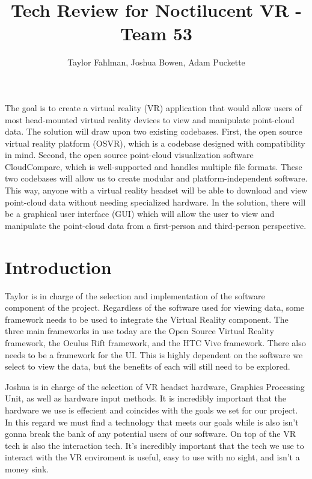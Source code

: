\documentclass{article}
\begin{document}
\title {Tech Review for Noctilucent VR - Team 53}
\author {Taylor Fahlman, Joshua Bowen, Adam Puckette}

\maketitle

\abstract

The goal is to create a virtual reality (VR) application that would allow users of most head-mounted virtual reality devices to view and manipulate point-cloud data. 
The solution will draw upon two existing codebases. 
First, the open source virtual reality platform (OSVR), which is a codebase designed with compatibility in mind. 
Second, the open source point-cloud visualization software CloudCompare, which is well-supported and handles multiple file formats. 
These two codebases will allow us to create modular and platform-independent software. 
This way, anyone with a virtual reality headset will be able to download and view point-cloud data without needing specialized hardware.
In the solution, there will be a graphical user interface (GUI) which will allow the user to view and manipulate the point-cloud data from a first-person and third-person perspective. 

\newpage
\thispagestyle{empty}
\mbox{}


\section{Introduction}

Taylor is in charge of the selection and implementation of the software component of the project.
Regardless of the software used for viewing data, some framework needs to be used to integrate the Virtual Reality component.
The three main frameworks in use today are the Open Source Virtual Reality framework, the Oculus Rift framework, and the 
HTC Vive framework.
There also needs to be a framework for the UI. This is highly dependent on the software we select to view the data,
but the benefits of each will still need to be explored.

Joshua is in charge of the selection of VR headset hardware, Graphics Processing Unit, as well as hardware input methods.
It is incredibly important that the hardware we use is effecient and coincides with the goals we set for our project.
In this regard we must find a technology that meets our goals while is also isn't gonna break the bank of any potential users of our software.
On top of the VR tech is also the interaction tech.
It's incredibly important that the tech we use to interact with the VR enviroment is useful, easy to use with no sight, and isn't a money sink.
\end{document}

